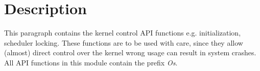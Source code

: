 \section{Description}

This paragraph contains the kernel control API functions e.g. initialization, scheduler locking.  These functions are to be used with care, since they allow (almost) direct control over the kernel wrong usage can result in system crashes.
All API functions in this module contain the prefix \textit{Os}.

